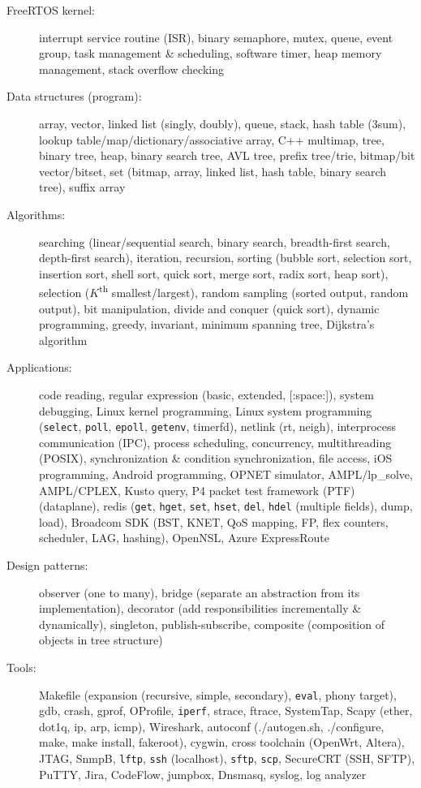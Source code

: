 \documentclass[letterpaper,11pt]{article}
\begin{document}
\begin{description}
\item[FreeRTOS kernel:] interrupt service routine (ISR), binary semaphore, mutex, queue, event group, task management \& scheduling, software timer,
heap memory management, stack overflow checking

\item[Data structures (program):] array, vector, linked list (singly, doubly), queue, stack,
hash table (3sum), lookup table/map/dictionary/associative array, C++ multimap,
tree, binary tree, heap, binary search tree, AVL tree, prefix tree/trie,
bitmap/bit vector/bitset, set (bitmap, array, linked list, hash table, binary search tree),
suffix array

\item[Algorithms:] searching (linear/sequential search, binary search, breadth-first search, depth-first search), iteration, recursion,
sorting (bubble sort, selection sort, insertion sort, shell sort, quick sort, merge sort, radix sort, heap sort),
selection ($K$\textsuperscript{th} smallest/largest),
random sampling (sorted output, random output),
bit manipulation, divide and conquer (quick sort), dynamic programming, greedy, invariant, minimum spanning tree, Dijkstra's algorithm

\item[Applications:] code reading, regular expression (basic, extended, [:space:]), system debugging, Linux kernel programming,
Linux system programming ({\tt select}, {\tt poll}, {\tt epoll}, {\tt getenv}, timerfd), netlink (rt, neigh),
interprocess communication (IPC), process scheduling,
concurrency, multithreading (POSIX), synchronization \& condition synchronization, file access, iOS programming, Android programming,
OPNET simulator, AMPL/lp\_solve, AMPL/CPLEX, Kusto query,
P4 packet test framework (PTF) (dataplane),
redis ({\tt get}, {\tt hget}, {\tt set}, {\tt hset}, {\tt del}, {\tt hdel} (multiple fields), dump, load),
Broadcom SDK (BST, KNET, QoS mapping, FP, flex counters, scheduler, LAG, hashing), OpenNSL,
Azure ExpressRoute

\item[Design patterns:] observer (one to many), bridge (separate an abstraction from its implementation),
decorator (add responsibilities incrementally \& dynamically), singleton, publish-subscribe, composite (composition of objects in tree structure)

\item[Tools:] Makefile (expansion (recursive, simple, secondary), {\tt eval}, phony target), gdb, crash, gprof, OProfile, {\tt iperf},
strace, ftrace, SystemTap,
Scapy (ether, dot1q, ip, arp, icmp), Wireshark, autoconf (./autogen.sh, ./configure, make, make install, fakeroot), cygwin, cross toolchain (OpenWrt, Altera),
JTAG, SnmpB,
{\tt lftp}, {\tt ssh} (localhost), {\tt sftp}, {\tt scp}, SecureCRT (SSH, SFTP), PuTTY,
Jira, CodeFlow,
jumpbox, Dnsmasq, syslog, log analyzer


\end{description}
\end{document}
